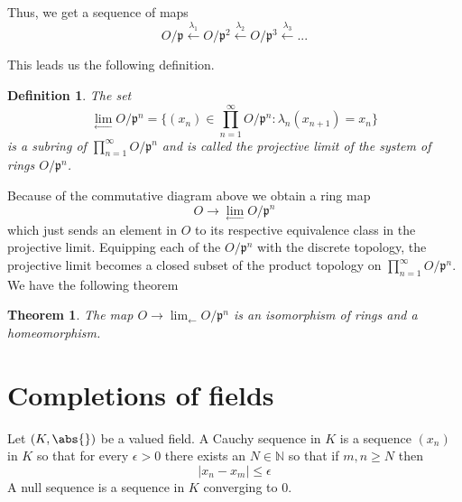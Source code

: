 \documentclass{article}
\newtheorem{theorem}{Theorem}[section]
\newtheorem{definition}{Definition}[section]
\newcommand{\mfrak}[1]{\mathfrak{#1}}
\newcommand{\mbb}[1]{\mathbb{#1}}
\begin{document}

Thus, we get a sequence of maps 
$$O / \mfrak p \xleftarrow {\lambda_1} O / \mfrak p^2 \xleftarrow {\lambda_2} O / \mfrak p^3 \xleftarrow {\lambda_3} ...$$

This leads us the following definition.
\begin{definition}
    The set
    $$\lim_{\leftarrow} O / \mfrak p^n = \{ (x_n) \in \prod_{n=1}^\infty O / \mfrak p^n : \lambda_n(x_{n+1}) = x_n \}$$
    is a subring of $\prod_{n=1}^\infty O / \mfrak p^n$ and is called the projective limit of the system of rings $O / \mfrak p^n$.
\end{definition}

Because of the commutative diagram above we obtain a ring map 
$$O \to \lim_{\leftarrow} O / \mfrak p^n$$
which just sends an element in $O$ to its respective equivalence class in the projective limit. Equipping each of the $O / \mfrak p^n$ with the discrete topology, the projective limit becomes a closed subset of the product topology on $\prod_{n=1}^\infty O / \mfrak p^n$. We have the following theorem

\begin{theorem}
    The map $O \to \lim_{\leftarrow} O / \mfrak p^n$ is an isomorphism of rings and a homeomorphism.
\end{theorem}


\section{Completions of fields}
Let $(K, \abs{})$ be a valued field. A Cauchy sequence in $K$ is a sequence $(x_n)$ in $K$ so that for every $\epsilon > 0$ there exists an $N \in \mbb N$ so that if $m,n \geq N$ then 
$$|x_n - x_m| \leq \epsilon$$
A null sequence is a sequence in $K$ converging to 0. 


\end{document}
